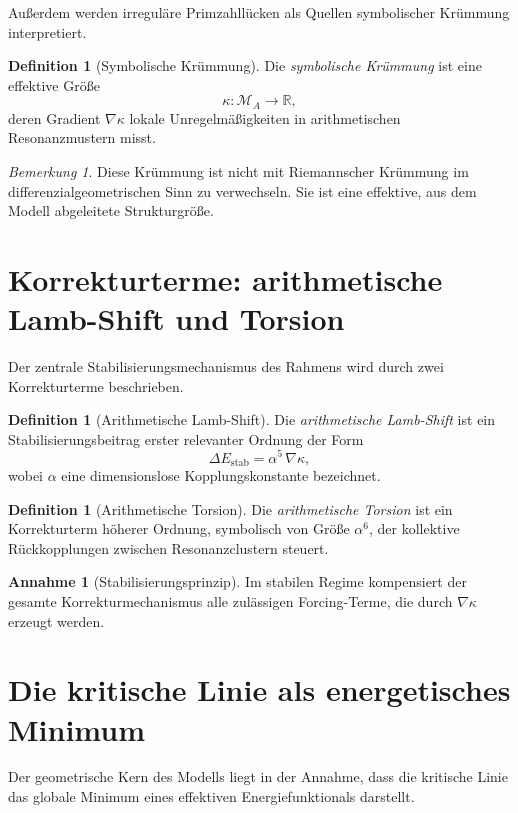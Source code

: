 \documentclass[11pt,a4paper]{amsart}
\theoremstyle{plain}
\theoremstyle{definition}
\newtheorem{definition}[satz]{Definition}
\newtheorem{annahme}[satz]{Annahme}
\theoremstyle{remark}
\newtheorem{bemerkung}[satz]{Bemerkung}
\newcommand{\RR}{\mathbb{R}}
\newcommand{\grad}{\nabla}
\newcommand{\MA}{\mathcal{M}_A}
\newcommand{\kappaF}{\kappa}
\begin{document}
	Außerdem werden irreguläre Primzahllücken als Quellen symbolischer Krümmung interpretiert.
	
	\begin{definition}[Symbolische Krümmung]
		Die \emph{symbolische Krümmung} ist eine effektive Größe
		\[
		\kappaF:\MA\to\RR,
		\]
		deren Gradient \(\grad\kappaF\) lokale Unregelmäßigkeiten in arithmetischen Resonanzmustern misst.
	\end{definition}
	
	\begin{bemerkung}
		Diese Krümmung ist nicht mit Riemannscher Krümmung im differenzialgeometrischen Sinn zu verwechseln. Sie ist eine effektive, aus dem Modell abgeleitete Strukturgröße.
	\end{bemerkung}
	
	\section{Korrekturterme: arithmetische Lamb-Shift und Torsion}
	
	Der zentrale Stabilisierungsmechanismus des Rahmens wird durch zwei Korrekturterme beschrieben.
	
	\begin{definition}[Arithmetische Lamb-Shift]
		Die \emph{arithmetische Lamb-Shift} ist ein Stabilisierungsbeitrag erster relevanter Ordnung der Form
		\[
		\Delta E_{\mathrm{stab}}=\alpha^5\,\grad\kappaF,
		\]
		wobei \(\alpha\) eine dimensionslose Kopplungskonstante bezeichnet.
	\end{definition}
	
	\begin{definition}[Arithmetische Torsion]
		Die \emph{arithmetische Torsion} ist ein Korrekturterm höherer Ordnung, symbolisch von Größe \(\alpha^6\), der kollektive Rückkopplungen zwischen Resonanzclustern steuert.
	\end{definition}
	
	\begin{annahme}[Stabilisierungsprinzip]
		Im stabilen Regime kompensiert der gesamte Korrekturmechanismus alle zulässigen Forcing-Terme, die durch \(\grad\kappaF\) erzeugt werden.
	\end{annahme}
	
	\section{Die kritische Linie als energetisches Minimum}
	
	Der geometrische Kern des Modells liegt in der Annahme, dass die kritische Linie das globale Minimum eines effektiven Energiefunktionals darstellt.
	
\end{document}
